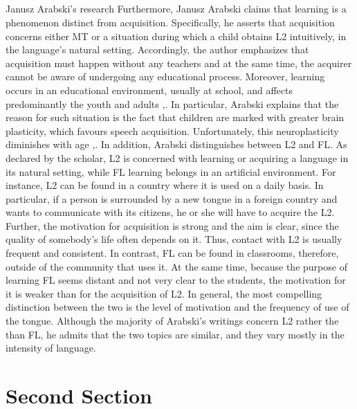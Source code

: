 \documentclass{article}
\begin{document}
\subsection{}
Janusz Arabski’s research
Furthermore, Janusz Arabski claims that learning is a phenomenon distinct from acquisition. Specifically, he asserts that acquisition concerns either MT or a situation during which a child obtains L2 intuitively, in the language’s natural setting. Accordingly, the author emphasizes that acquisition must happen without any teachers and at the same time, the acquirer cannot be aware of undergoing any educational process. Moreover, learning occurs in an educational environment, usually at school, and affects predominantly the youth and adults \cite{arabski_przyswajanie_1996},. In particular, Arabski explains that the reason for such situation is the fact that children are marked with greater brain plasticity, which favours speech acquisition. Unfortunately, this neuroplasticity diminishes with age \cite{arabski_przyswajanie_1996},.
In addition, Arabski distinguishes between L2 and FL. As declared by the scholar, L2 is concerned with learning or acquiring a language in its natural setting, while FL learning belongs in an artificial environment. For instance, L2 can be found in a country where it is used on a daily basis. In particular, if a person is surrounded by a new tongue in a foreign country and wants to communicate with its citizens, he or she will have to acquire the L2. Further, the motivation for acquisition is strong and the aim is clear, since the quality of somebody’s life often depends on it. Thus, contact with L2 is usually frequent and consistent. In contrast, FL can be found in classrooms, therefore, outside of the community that uses it. At the same time, because the purpose of learning FL seems distant and not very clear to the students, the motivation for it is weaker than for the acquisition of L2. In general, the most compelling distinction between the two is the level of motivation and the frequency of use of the tongue. Although the majority of Arabski’s writings concern L2 rather the than FL, he admits that the two topics are similar, and they vary mostly in the intensity of language.
\section{Second Section}
\end{document}
